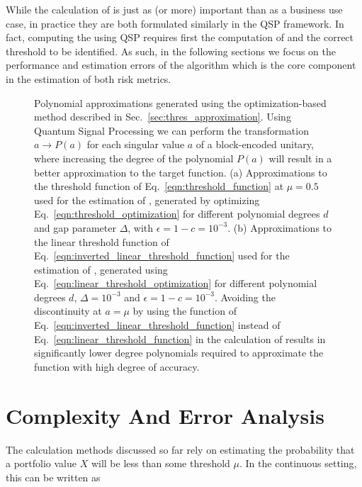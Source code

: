 \begin{enumerate}
While the calculation of \cvar{} is just as (or more) important than \var{} as a business use case, in practice they are both formulated similarly in the QSP framework.
In fact, computing the \cvar{} using QSP requires first the computation of \var{} and the correct threshold to be identified.
As such, in the following sections we focus on the performance and estimation errors of the \var{} algorithm which is the core component in the estimation of both risk metrics.

\begin{figure}[t]
\caption{Polynomial approximations generated using the optimization-based method described in Sec.~\ref{sec:thres_approximation}. Using Quantum Signal Processing we can perform the transformation $a \rightarrow P(a)$ for each singular value $a$ of a block-encoded unitary, where increasing the degree of the polynomial $P(a)$ will result in a better approximation to the target function. (a) Approximations to the threshold function of Eq.~\eqref{eqn:threshold_function} at $\mu=0.5$ used for the estimation of \var{}, generated by optimizing Eq.~\eqref{eqn:threshold_optimization} for different polynomial degrees $d$ and gap parameter $\Delta$, with $\epsilon=1-c=10^{-3}$. (b) Approximations to the linear threshold function of Eq.~\eqref{eqn:inverted_linear_threshold_function} used for the estimation of \cvar{}, generated using Eq.~\eqref{eqn:linear_threshold_optimization} for different polynomial degrees $d$, $\Delta=10^{-3}$ and $\epsilon=1-c=10^{-3}$. Avoiding the discontinuity at $a=\mu$ by using the function of Eq.~\eqref{eqn:inverted_linear_threshold_function} instead of Eq.~\eqref{eqn:linear_threshold_function} in the calculation of \cvar{} results in significantly lower degree polynomials required to approximate the function with high degree of accuracy.}\label{fig:thres_approximation}
\end{figure}

\section{Complexity And Error Analysis}
\label{sec:error_analysis}
The \var{} calculation methods discussed so far rely on estimating the probability that a portfolio value $X$ will be less than some threshold $\mu$.
In the continuous setting, this can be written as


\end{enumerate}
